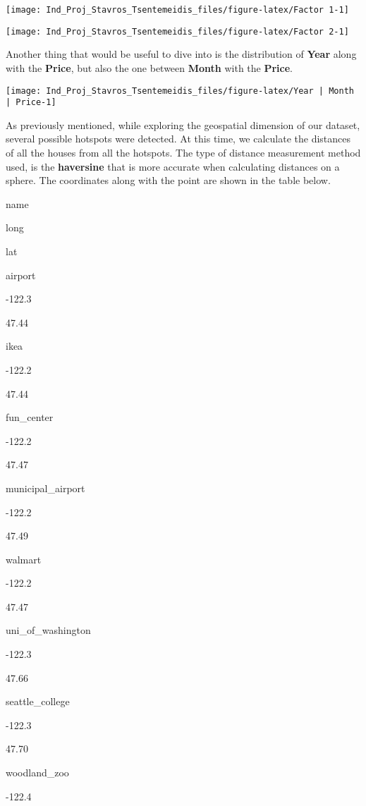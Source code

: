 \documentclass[]{article}
\begin{document}
\begin{center}\texttt{[image: Ind\_Proj\_Stavros\_Tsentemeidis\_files/figure-latex/Factor 1-1]} \end{center}

\begin{center}\texttt{[image: Ind\_Proj\_Stavros\_Tsentemeidis\_files/figure-latex/Factor 2-1]} \end{center}

Another thing that would be useful to dive into is the distribution of
\textbf{Year} along with the \textbf{Price}, but also the one between
\textbf{Month} with the \textbf{Price}.

\begin{center}\texttt{[image: Ind\_Proj\_Stavros\_Tsentemeidis\_files/figure-latex/Year | Month | Price-1]} \end{center}

As previously mentioned, while exploring the geospatial dimension of our
dataset, several possible hotspots were detected. At this time, we
calculate the distances of all the houses from all the hotspots. The
type of distance measurement method used, is the \textbf{haversine} that
is more accurate when calculating distances on a sphere. The coordinates
along with the point are shown in the table below.

name

long

lat

airport

-122.3

47.44

ikea

-122.2

47.44

fun\_center

-122.2

47.47

municipal\_airport

-122.2

47.49

walmart

-122.2

47.47

uni\_of\_washington

-122.3

47.66

seattle\_college

-122.3

47.70

woodland\_zoo

-122.4
\end{document}

